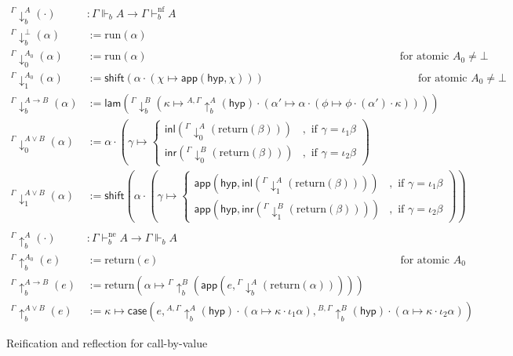 \documentclass{eptcs}
\newcommand{\hyp}{\mathsf{hyp}}
\newcommand{\inl}[1]{\mathsf{inl}{(#1)}}
\newcommand{\inr}[1]{\mathsf{inr}{(#1)}}
\newcommand{\lam}[1]{\mathsf{lam}{(#1)}}
\newcommand{\shift}[1]{\mathsf{shift}{(#1)}}
\newcommand{\casemy}[3]{\mathsf{case}({#1},{#2},{#3})}
\newcommand{\app}[2]{\mathsf{app}({#1},{#2})}
\newcommand{\normal}{{\!\!\text{nf}}}
\newcommand{\neutral}{{\!\!\text{ne}}}
\newcommand{\forces}[3]{{#1}\Vdash_{#2}{#3}}
\newcommand{\run}[1]{\text{run}{(#1)}}
\newcommand{\ret}[1]{\text{return}{(#1)}}
\newcommand{\lsup}[1]{{{^#1}}\!\!\!}
\newcommand{\reify}[4]{\lsup{#1}\downarrow_{#2}^{\!{#3}}({#4})}
\newcommand{\reflect}[4]{\lsup{#1}\uparrow_{#2}^{\!{#3}}({#4})}
\theoremstyle{definition}
\theoremstyle{plain}
\theoremstyle{remark}
\begin{document}
\begin{figure*}
\centering
  \begin{align*}
    \reify{\Gamma}{b}{A}{\cdot} &: \forces{\Gamma}{b}{A} \to \Gamma\vdash^\normal_b A\\
    \reify{\Gamma}{b}{\bot}{\alpha} &:= \run{\alpha} \\
    \reify{\Gamma}{0}{A_0}{\alpha} &:= \run{\alpha}\quad\quad\quad\qquad\qquad\qquad\qquad\qquad\qquad\qquad\qquad\qquad\qquad \text{for atomic }A_0\neq \bot \\
    \reify{\Gamma}{1}{A_0}{\alpha} &:= \shift{\alpha\cdot(\chi\mapsto\app{\hyp}{\chi})}\qquad\qquad\qquad\qquad\qquad\qquad\qquad \text{for atomic }A_0\neq \bot\\
    \reify{\Gamma}{b}{A\to B}{\alpha} &:= \lam{\reify{\Gamma}{b}{B}{\kappa\mapsto \reflect{{A,\Gamma}}{b}{A}{\hyp}\cdot (\alpha'\mapsto\alpha\cdot(\phi\mapsto\phi\cdot(\boxed{\alpha'})\cdot\kappa))}}\\
    \reify{\Gamma}{0}{A\vee B}{\alpha} &:= \alpha\cdot\left(\gamma\mapsto\left\{
      \begin{array}{ll}
        \inl{\reify{{\Gamma}}{0}{A}{\boxed{\ret{\beta}}}} & ,\text{ if } \gamma=\iota_1\beta\\
        \inr{\reify{{\Gamma}}{0}{B}{\boxed{\ret{\beta}}}} & ,\text{ if } \gamma=\iota_2\beta
      \end{array}
    \right.\right)\\
    \reify{\Gamma}{1}{A\vee B}{\alpha} &:=\shift{\alpha\cdot\left(\gamma\mapsto\left\{
      \begin{array}{ll}
        \app{\hyp}{\inl{\reify{{\Gamma}}{1}{A}{\boxed{\ret{\beta}}}}} & ,\text{ if } \gamma=\iota_1\beta\\
        \app{\hyp}{\inr{\reify{{\Gamma}}{1}{B}{\boxed{\ret{\beta}}}}} & ,\text{ if } \gamma=\iota_2\beta
      \end{array}
    \right.\right)}\\
    ~ & ~\\
    \reflect{\Gamma}{b}{A}{\cdot} &: \Gamma\vdash^\neutral_b A\to \forces{\Gamma}{b}{A}\\
    \reflect{\Gamma}{b}{A_0}{e} &:= \ret{e}\quad\quad\qquad\qquad\qquad\qquad\qquad\qquad\qquad\qquad\qquad\qquad \text{for atomic }A_0\\
    \reflect{\Gamma}{b}{A\to B}{e} &:= \ret{\alpha\mapsto\reflect{\Gamma}{b}{B}{\app{e}{\reify{\Gamma}{b}{A}{\boxed{\ret{\alpha}}}}}}\\
    \reflect{\Gamma}{b}{A\vee B}{e} &:= \kappa\mapsto\casemy{e}{\reflect{{A,\Gamma}}{b}{A}{\hyp}\cdot(\alpha\mapsto\kappa\cdot\iota_1\boxed{\alpha})}{\reflect{{B,\Gamma}}{b}{B}{\hyp}\cdot(\alpha\mapsto\kappa\cdot\iota_2\boxed{\alpha})}
  \end{align*}  
  \caption{Reification and reflection for call-by-value}
  \label{fig:reifycbv}
\end{figure*}
\end{document}
